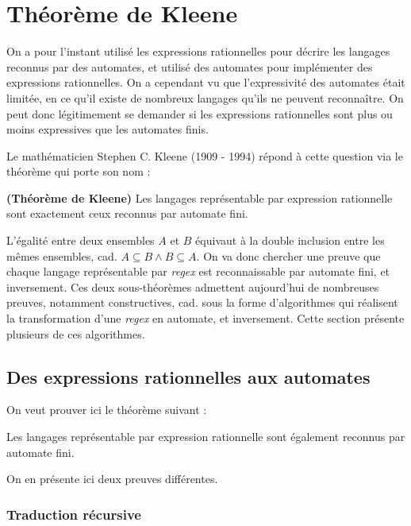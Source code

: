 \chapter{Théorème de Kleene}
\label{hierarchie}

On a pour l'instant utilisé les expressions rationnelles pour décrire les langages reconnus par des automates, et utilisé des automates pour implémenter des expressions rationnelles. On a cependant vu que l'expressivité des automates était limitée, en ce qu'il existe de nombreux langages qu'ils ne peuvent reconnaître. On peut donc légitimement se demander si les expressions rationnelles sont plus ou moins expressives que les automates finis.

Le mathématicien Stephen C. Kleene (1909 - 1994) répond à cette question via le théorème qui porte son nom :

\begin{theorem}{\textbf{(Théorème de Kleene)}}
Les langages représentable par expression rationnelle sont exactement ceux reconnus par automate fini.
\end{theorem}

L'égalité entre deux ensembles $A$ et $B$ équivaut à la double inclusion entre les mêmes ensembles, cad. $A \subseteq B \wedge B \subseteq A$. On va donc chercher une preuve que chaque langage représentable par \textit{regex} est reconnaissable par automate fini, et inversement. Ces deux sous-théorèmes admettent aujourd'hui de nombreuses preuves, notamment constructives, cad. sous la forme d'algorithmes qui réalisent la transformation d'une \textit{regex} en automate, et inversement. Cette section présente plusieurs de ces algorithmes.

\section{Des expressions rationnelles aux automates}

On veut prouver ici le théorème suivant :

\begin{theorem}
Les langages représentable par expression rationnelle sont également reconnus par automate fini.
\end{theorem}

On en présente ici deux preuves différentes.

\subsection{Traduction récursive}

